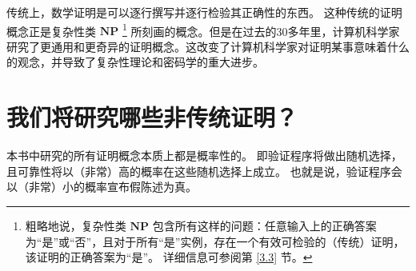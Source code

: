 传统上，数学证明是可以逐行撰写并逐行检验其正确性的东西。 这种传统的证明概念正是复杂性类 $\mathbf{N P}$ \footnote{粗略地说，复杂性类 $\mathbf{N P}$ 包含所有这样的问题：任意输入上的正确答案为“是”或“否”，且对于所有“是”实例，存在一个有效可检验的（传统）证明，该证明的正确答案为“是”。 详细信息可参阅第 \ref{3.3} 节。} 所刻画的概念。但是在过去的30多年里，计算机科学家研究了更通用和更奇异的证明概念。这改变了计算机科学家对证明某事意味着什么的观念，并导致了复杂性理论和密码学的重大进步。


\section{我们将研究哪些非传统证明？}
本书中研究的所有证明概念本质上都是概率性的。
即验证程序将做出随机选择，且可靠性将以（非常）高的概率在这些随机选择上成立。 
也就是说，验证程序会以（非常）小的概率宣布假陈述为真。

